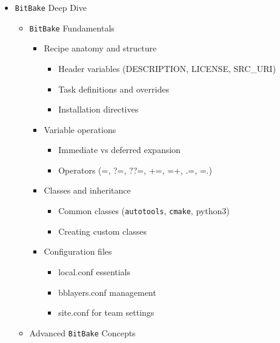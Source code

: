 \documentclass[
]{article}
\providecommand{\tightlist}{%
  \setlength{\itemsep}{0pt}\setlength{\parskip}{0pt}}
\begin{document}
\begin{itemize}
\tightlist
\item
  \texttt{BitBake} Deep Dive

  \begin{itemize}
  \tightlist
  \item
    \texttt{BitBake} Fundamentals

    \begin{itemize}
    \tightlist
    \item
      Recipe anatomy and structure

      \begin{itemize}
      \tightlist
      \item
        Header variables (DESCRIPTION, LICENSE, SRC\_URI)
      \item
        Task definitions and overrides
      \item
        Installation directives
      \end{itemize}
    \item
      Variable operations

      \begin{itemize}
      \tightlist
      \item
        Immediate vs deferred expansion
      \item
        Operators (=, ?=, ??=, +=, =+, .=, =.)
      \end{itemize}
    \item
      Classes and inheritance

      \begin{itemize}
      \tightlist
      \item
        Common classes (\texttt{autotools}, \texttt{cmake}, python3)
      \item
        Creating custom classes
      \end{itemize}
    \item
      Configuration files

      \begin{itemize}
      \tightlist
      \item
        local.conf essentials
      \item
        bblayers.conf management
      \item
        site.conf for team settings
      \end{itemize}
    \end{itemize}
  \item
    Advanced \texttt{BitBake} Concepts


\end{itemize}
\end{itemize}
\end{document}
